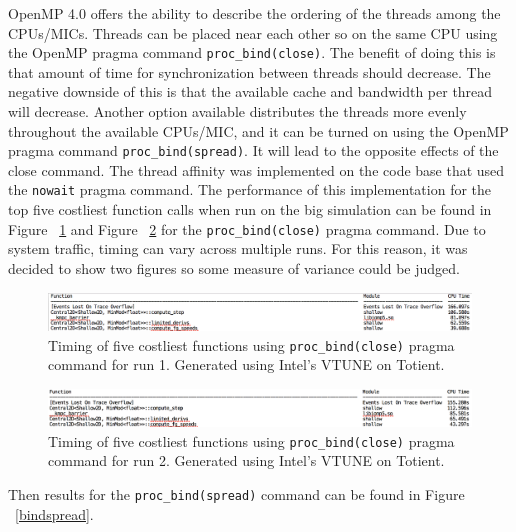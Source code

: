 \documentclass[12pt]{article}
\begin{document}
		OpenMP 4.0 offers the ability to describe the ordering of the threads among the CPUs/MICs. Threads can be placed near each other so on the same CPU using the OpenMP pragma command \texttt{proc\_bind(close)}. The benefit of doing this is that amount of time for synchronization between threads should decrease. The negative downside of this is that the available cache and bandwidth per thread will decrease. Another option available distributes the threads more evenly throughout the available CPUs/MIC, and it can be turned on using the OpenMP pragma command \texttt{proc\_bind(spread)}. It will lead to the opposite effects of the close command. The thread affinity was implemented on the code base that used the \texttt{nowait} pragma command. The performance of this implementation for the top five costliest function calls when run on the big simulation can be found in Figure ~\ref{nowait} and Figure ~\ref{nowait2} for the \texttt{proc\_bind(close)} pragma command. Due to system traffic, timing can vary across multiple runs. For this reason, it was decided to show two figures so some measure of variance could be judged.
		
		\begin{figure}[h]
			\begin{center}
				\includegraphics[width=0.8\columnwidth]{nowait}
				\caption{Timing of five costliest functions using \texttt{proc\_bind(close)} pragma command for run 1. Generated using Intel's VTUNE on Totient.}
				\label{nowait}
			\end{center}
		\end{figure}
		
		\begin{figure}[h]
			\begin{center}
				\includegraphics[width=0.8\columnwidth]{nowait2}
				\caption{Timing of five costliest functions using \texttt{proc\_bind(close)} pragma command for run 2. Generated using Intel's VTUNE on Totient.}
				\label{nowait2}
			\end{center}
		\end{figure}
		
		\noindent Then results for the \texttt{proc\_bind(spread)} command can be found in Figure ~\ref{bindspread}.
		
\end{document}
